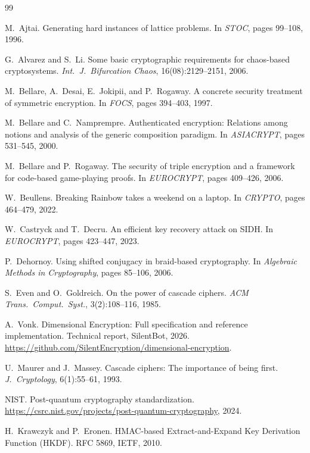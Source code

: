 \documentclass[11pt]{article}
\begin{document}
\begin{thebibliography}{99}

M.~Ajtai.
\newblock Generating hard instances of lattice problems.
\newblock In \emph{STOC}, pages 99--108, 1996.

G.~Alvarez and S.~Li.
\newblock Some basic cryptographic requirements for chaos-based cryptosystems.
\newblock \emph{Int.\ J.\ Bifurcation Chaos}, 16(08):2129--2151, 2006.

M.~Bellare, A.~Desai, E.~Jokipii, and P.~Rogaway.
\newblock A concrete security treatment of symmetric encryption.
\newblock In \emph{FOCS}, pages 394--403, 1997.

M.~Bellare and C.~Namprempre.
\newblock Authenticated encryption: Relations among notions and analysis of the
  generic composition paradigm.
\newblock In \emph{ASIACRYPT}, pages 531--545, 2000.

M.~Bellare and P.~Rogaway.
\newblock The security of triple encryption and a framework for code-based
  game-playing proofs.
\newblock In \emph{EUROCRYPT}, pages 409--426, 2006.

W.~Beullens.
\newblock Breaking Rainbow takes a weekend on a laptop.
\newblock In \emph{CRYPTO}, pages 464--479, 2022.

W.~Castryck and T.~Decru.
\newblock An efficient key recovery attack on SIDH.
\newblock In \emph{EUROCRYPT}, pages 423--447, 2023.

P.~Dehornoy.
\newblock Using shifted conjugacy in braid-based cryptography.
\newblock In \emph{Algebraic Methods in Cryptography}, pages 85--106, 2006.

S.~Even and O.~Goldreich.
\newblock On the power of cascade ciphers.
\newblock \emph{ACM Trans.\ Comput.\ Syst.}, 3(2):108--116, 1985.

A.~Vonk.
\newblock Dimensional Encryption: Full specification and reference implementation.
\newblock Technical report, SilentBot, 2026.
\newblock \url{https://github.com/SilentEncryption/dimensional-encryption}.

U.~Maurer and J.~Massey.
\newblock Cascade ciphers: The importance of being first.
\newblock \emph{J.\ Cryptology}, 6(1):55--61, 1993.

NIST.
\newblock Post-quantum cryptography standardization.
\newblock \url{https://csrc.nist.gov/projects/post-quantum-cryptography}, 2024.

H.~Krawczyk and P.~Eronen.
\newblock HMAC-based Extract-and-Expand Key Derivation Function (HKDF).
\newblock RFC 5869, IETF, 2010.

\end{thebibliography}
\end{document}
